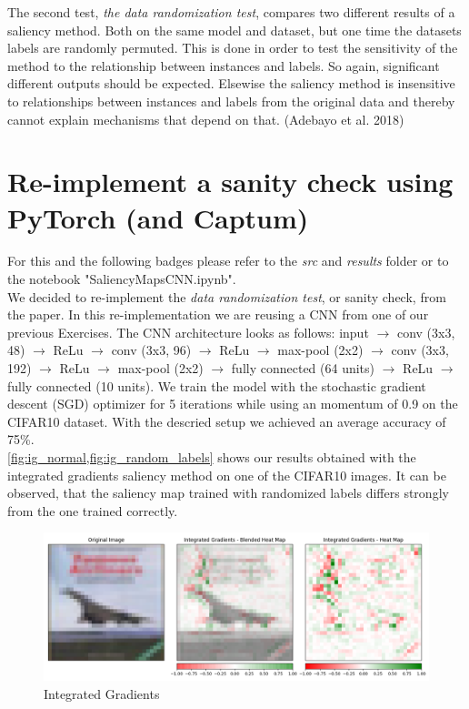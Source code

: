 \documentclass{article}
\begin{document}
The second test, \textit{the data randomization test}, compares two different results of a saliency method. Both on the same model and dataset, but one time the datasets labels are randomly permuted. This is done in order to test the sensitivity of the method to the relationship between instances and labels. So again, significant different outputs should be expected. Elsewise the saliency method is insensitive to relationships between instances and labels from the original data and thereby cannot explain mechanisms that depend on that. (Adebayo et al. 2018) \par

\section{Re-implement a sanity check using PyTorch (and Captum)}
For this and the following badges please refer to the \textit{src} and \textit{results} folder or to the notebook "SaliencyMapsCNN.ipynb".\\

We decided to re-implement the \textit{data randomization test}, or sanity check, from the paper. In this re-implementation we are reusing a CNN from one of our previous Exercises. The CNN architecture looks as follows: input $\to$ conv (3x3, 48) $\to$ ReLu $\to$ conv (3x3, 96) $\to$ ReLu $\to$ max-pool (2x2) $\to$ conv (3x3, 192) $\to$ ReLu $\to$ max-pool (2x2) $\to$ fully connected (64 units) $\to$ ReLu $\to$ fully connected (10 units). We train the model with the stochastic gradient descent (SGD) optimizer for 5 iterations while using an momentum of 0.9 on the CIFAR10 dataset. With the descried setup we achieved an average accuracy of 75\%.\\

\cref{fig:ig_normal,fig:ig_random_labels} shows our results obtained with the integrated gradients saliency method on one of the CIFAR10 images. It can be observed, that the saliency map trained with randomized labels differs strongly from the one trained correctly.

\begin{figure}[h!]
\centering
\includegraphics[width=\textwidth]{results/IG_normal.png}
\caption{Integrated Gradients}
\label{fig:ig_normal}
\end{figure}
\end{document}
